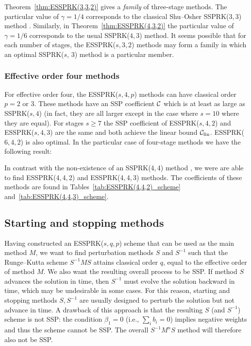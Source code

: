 Theorem~\ref{thm:ESSPRK(3,3,2)} gives a \emph{family} of three-stage 
methods. 
The particular value of $\gamma = 1/4$ corresponds to the classical
Shu--Osher SSPRK($3,3$) method \cite{Gottlieb/Shu:1998}.
Similarly, in Theorem~\ref{thm:ESSPRK(4,3,2)} the particular value of 
$\gamma = 1/6$ corresponds to the usual SSPRK($4,3$) method.
It seems possible that for each number of stages, the 
ESSPRK($s, 3, 2$) methods may form a family in which an optimal 
SSPRK($s$, $3$) method is a particular member. 

\subsubsection{Effective order four methods}\label{subsubsec:4th_ESSPRK}
For effective order four, the ESSPRK($s,4,p$) methods can have
classical order $p=2$ or $3$.
These methods have an SSP coefficient $\mathcal{C}$ which is at least as
large as SSPRK($s, 4$) (in fact, they are all larger except in the
case where $s =10$ where they are equal).
For stages $s \ge 7$ the SSP coefficient of ESSPRK($s,4,2$) and
ESSPRK($s,4,3$) are the same and both achieve the linear bound
$\mathcal{C}_{\text{lin}}$.
ESSPRK($6,4,2$) is also optimal.
In the particular case of four-stage methods we have the following result:
\begin{result}
	In contrast with the non-existence of an SSPRK(4,\,4) method 
	\cite{Gottlieb/Shu:1998,Ruuth2002}, 
	we were are able to find ESSPRK(4,\,4,\,2) and ESSPRK(4,\,4,\,3) methods.
	The coefficients of these methods are found in
	Tables~\ref{tab:ESSPRK(4,4,2)_scheme}
	and~\ref{tab:ESSPRK(4,4,3)_scheme}.
\end{result}

\subsection{Starting and stopping methods}\label{subsec:starting_stopping}
Having constructed an ESSPRK($s,q,p$) scheme that can be used as the main 
method $M$, we want to find perturbation methods $S$ and $S^{-1}$ such that the 
Runge--Kutta scheme $S^{-1}MS$ attains classical order $q$, equal to the 
effective order of method $M$.
We also want the resulting overall process to be SSP.
If method $S$ advances the solution in time, then $S^{-1}$ must evolve the 
solution backward in time, which may be undesirable in some cases. 
For this reason, starting and stopping methods $S, S^{-1}$ are usually 
designed to perturb the solution but not advance in time. 
A drawback of this approach is that the resulting $S$ (and $S^{-1}$) scheme 
is not SSP:
the condition $\beta_1 = 0$ (i.e., $\sum_i b_i = 0$) implies negative
weights and thus the scheme cannot be SSP.
The overall $S^{-1}M^nS$ method will therefore also not be SSP.

